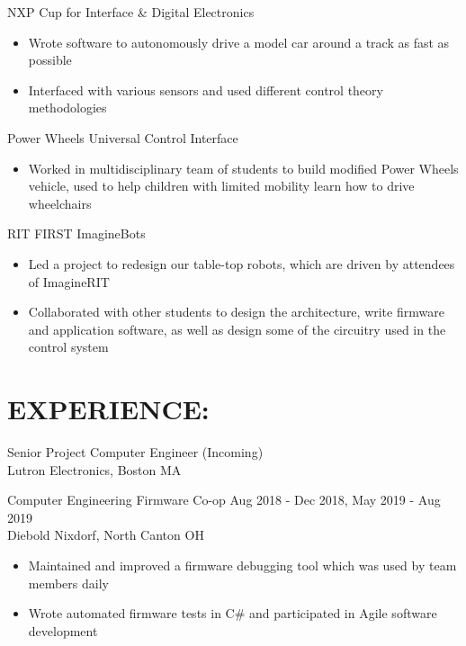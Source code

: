 \documentclass[line,margin]{res}
\begin{document}
\begin{resume}

		NXP Cup for Interface \& Digital Electronics
		\begin{itemize}
			\item Wrote software to autonomously drive a model car around a track as fast as possible
			\item Interfaced with various sensors and used different control theory methodologies
		\end{itemize}
		\vspace{-10pt}

		Power Wheels Universal Control Interface
		\begin{itemize}
			\item Worked in multidisciplinary team of students to build modified Power Wheels vehicle, used to help children with limited mobility learn how to drive wheelchairs
		\end{itemize}
		\vspace{-10pt}

		RIT FIRST ImagineBots
		\begin{itemize}
			\item Led a project to redesign our table-top robots, which are driven by attendees of ImagineRIT 
			\item Collaborated with other students to design the architecture, write firmware and application software, as well as design some of the circuitry used in the control system
		\end{itemize}

	\section{EXPERIENCE:}

		Senior Project Computer Engineer \hfill (Incoming)\\
		Lutron Electronics, Boston MA
		\vspace{-8pt}

		Computer Engineering Firmware Co-op \hfill Aug 2018 - Dec 2018, May 2019 - Aug 2019\\
		Diebold Nixdorf, North Canton OH
		\begin{itemize}
			\item Maintained and improved a firmware debugging tool which was used by team members daily
			\item Wrote automated firmware tests in C\# and participated in Agile software development
		\end{itemize}
		\vspace{-8pt}


\end{resume}
\end{document}
